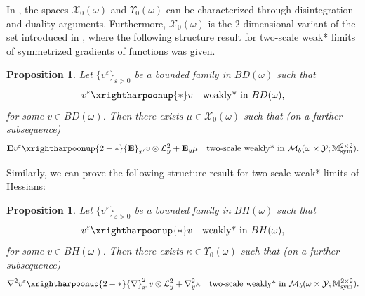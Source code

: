\documentclass[reqno,10pt]{amsart}
\numberwithin{equation}{section}
\newtheorem{proposition}[theorem]{Proposition}
\theoremstyle{remark}
\newcommand{\calL}{\mathcal{L}}
\newcommand{\M}{\mathbb{M}}
\newcommand{\calY}{\mathcal{Y}}
\DeclareMathOperator{\sym}{sym}
\newcommand{\weakstar}{\xrightharpoonup{*}}
\newcommand{\weakstartwoscale}{\xrightharpoonup{2-*}}
\renewcommand{\div}{\operatorname{div}}
\newcommand{\eps}{\varepsilon}
\newcommand{\Mb}{\mathcal{M}_b}
\newcommand{\calXzero}[1]{\mathcal{X}_0({#1})}
\newcommand{\calYzero}[1]{\Upsilon_0({#1})}
\newcommand{\E}{{\bf E}}
\newcommand{\D}{\nabla}
\begin{document}

In \cite[Section 4.1.2]{Buzancic.Davoli.Velcic.2024.2nd}, the spaces $\calXzero{\omega}$ and $\calYzero{\omega}$ can be characterized through disintegration and duality arguments.
Furthermore, $\calXzero{\omega}$ is the $2$-dimensional variant of the set introduced in \cite[Section 4.2]{Francfort.Giacomini.2014}, where the following structure result for two-scale weak* limits of symmetrized
gradients of functions was given.

\begin{proposition} \label{two-scale limit of symmetrized gradients}
Let $\{v^\eps\}_{\eps>0}$ be a bounded family in $BD(\omega)$ such that
\begin{equation*}
	v^\eps \weakstar v \quad \text{weakly* in $BD(\omega)$},
\end{equation*}
for some $v \in BD(\omega)$. 
Then there exists $\mu \in \calXzero{\omega}$ such that (on a further subsequence)
\begin{equation*}
	{\E}v^\eps \weakstartwoscale {\E}_{x'} v \otimes \calL^{2}_{y} + {\E}_{y}\mu \quad \text{two-scale weakly* in $\Mb(\omega \times \calY;\M^{2 \times 2}_{\sym})$}.
\end{equation*}
\end{proposition}

Similarly, we can prove the following structure result for two-scale weak* limits of Hessians:

\begin{proposition} \label{two-scale limit of Hessians}
Let $\{v^\eps\}_{\eps>0}$ be a bounded family in $BH(\omega)$ such that
\begin{equation*}
	v^\eps \weakstar v \quad \text{weakly* in $BH(\omega)$},
\end{equation*}
for some $v \in BH(\omega)$. 
Then there exists $\kappa \in \calYzero{\omega}$ such that (on a further subsequence)
\begin{equation*}
	{\D}^2v^\eps \weakstartwoscale {\D}^2_{x'}v \otimes \calL^{2}_{y} + {\D}^2_{y}\kappa \quad \text{two-scale weakly* in $\Mb(\omega \times \calY;\M^{2 \times 2}_{\sym})$}.
\end{equation*}
\end{proposition}
\end{document}
